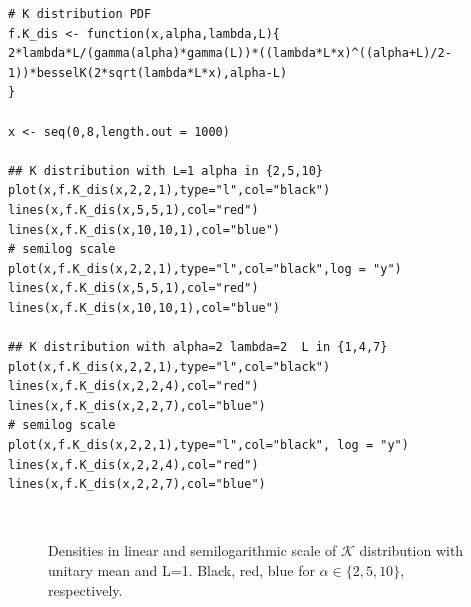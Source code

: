 \documentclass[conference,onecolumn]{IEEEtran}
\begin{document}
\begin{lstlisting}[caption={$\mathcal{K}$ distribution}]
# K distribution PDF
f.K_dis <- function(x,alpha,lambda,L){
2*lambda*L/(gamma(alpha)*gamma(L))*((lambda*L*x)^((alpha+L)/2-1))*besselK(2*sqrt(lambda*L*x),alpha-L)
}

x <- seq(0,8,length.out = 1000)

## K distribution with L=1 alpha in {2,5,10}
plot(x,f.K_dis(x,2,2,1),type="l",col="black")
lines(x,f.K_dis(x,5,5,1),col="red")
lines(x,f.K_dis(x,10,10,1),col="blue")
# semilog scale
plot(x,f.K_dis(x,2,2,1),type="l",col="black",log = "y")
lines(x,f.K_dis(x,5,5,1),col="red")
lines(x,f.K_dis(x,10,10,1),col="blue")

## K distribution with alpha=2 lambda=2  L in {1,4,7}
plot(x,f.K_dis(x,2,2,1),type="l",col="black")
lines(x,f.K_dis(x,2,2,4),col="red")
lines(x,f.K_dis(x,2,2,7),col="blue")
# semilog scale
plot(x,f.K_dis(x,2,2,1),type="l",col="black", log = "y")
lines(x,f.K_dis(x,2,2,4),col="red")
lines(x,f.K_dis(x,2,2,7),col="blue")
\end{lstlisting}

\begin{figure}[htb]
	\centering
	\ 
	\ 
	\caption{Densities in linear and semilogarithmic scale of $\mathcal{K}$ distribution with unitary mean and L=1. Black, red, blue for $\alpha\in\{2,5,10\}$, respectively.}
	\label{Fig:K_dis_alpha}
\end{figure}
\end{document}
